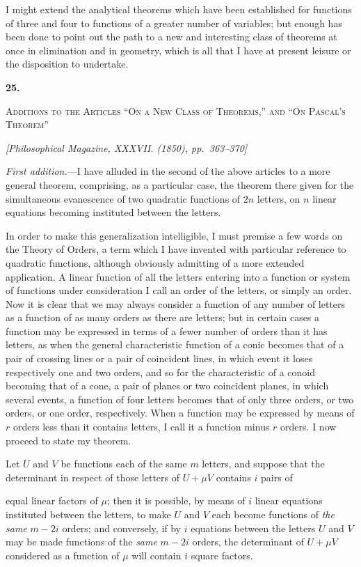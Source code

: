 \documentclass[11pt]{article}
\newcommand{\paperhead}[3]{%
  \clearpage
  \begin{center}
  {\Large\bfseries #1.}\par\vspace{0.85em}
  {\large\scshape #2}\par\vspace{0.6em}
  {\itshape [#3]}\par
  \end{center}\vspace{0.4em}}
\newcommand{\sourcepage}[1]{\marginpar{\scriptsize p.~#1}}
\begin{document}
{{I might extend the analytical theorems which have been established for functions of three and four to functions of a greater number of variables; but enough has been done to point out the path to a new and interesting class of theorems at once in elimination and in geometry, which is all that I have at present leisure or the disposition to undertake.

\paperhead{25}{Additions to the Articles ``On a New Class of Theorems,'' and ``On Pascal's Theorem''}{Philosophical Magazine, XXXVII. (1850), pp.~363--370}

\sourcepage{145}
\emph{First addition.}---I have alluded in the second of the above articles to a more general theorem, comprising, as a particular case, the theorem there given for the simultaneous evanescence of two quadratic functions of $2n$ letters, on $n$ linear equations becoming instituted between the letters.

In order to make this generalization intelligible, I must premise a few words on the Theory of Orders, a term which I have invented with particular reference to quadratic functions, although obviously admitting of a more extended application. A linear function of all the letters entering into a function or system of functions under consideration I call an order of the letters, or simply an order. Now it is clear that we may always consider a function of any number of letters as a function of as many orders as there are letters; but in certain cases a function may be expressed in terms of a fewer number of orders than it has letters, as when the general characteristic function of a conic becomes that of a pair of crossing lines or a pair of coincident lines, in which event it loses respectively one and two orders, and so for the characteristic of a conoid becoming that of a cone, a pair of planes or two coincident planes, in which several events, a function of four letters becomes that of only three orders, or two orders, or one order, respectively. When a function may be expressed by means of $r$ orders less than it contains letters, I call it a function minus $r$ orders. I now proceed to state my theorem.

Let $U$ and $V$ be functions each of the same $m$ letters, and suppose that the determinant in respect of those letters of $U+\mu V$ contains $i$ pairs of

\sourcepage{146}
equal linear factors of $\mu$; then it is possible, by means of $i$ linear equations instituted between the letters, to make $U$ and $V$ each become functions of \emph{the same} $m-2i$ orders; and conversely, if by $i$ equations between the letters $U$ and $V$ may be made functions of the \emph{same} $m-2i$ orders, the determinant of $U+\mu V$ considered as a function of $\mu$ will contain $i$ square factors.

}}
\end{document}
